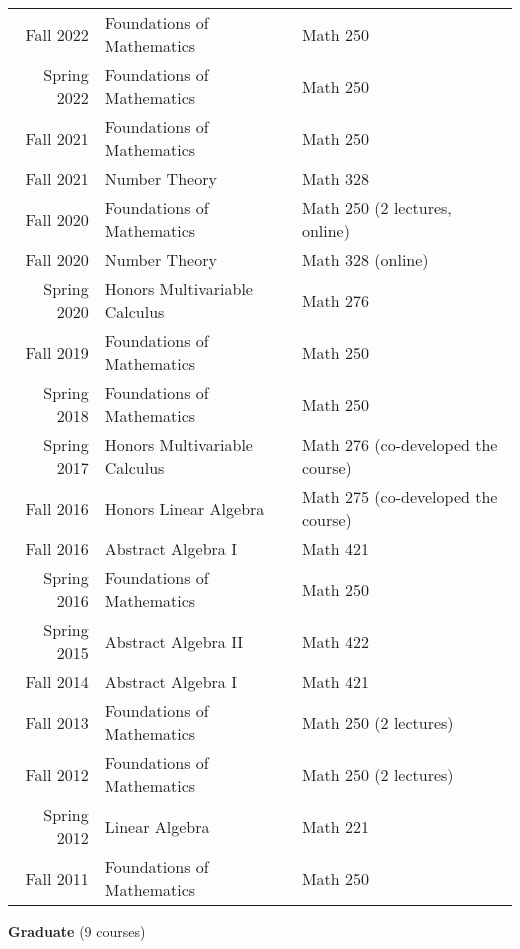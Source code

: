 \documentclass[margin,line]{res}
\newcommand{\defi}[1]{\textsf{#1}} 				%
\begin{document}
\begin{resume}
\begin{tabular}{rll}
 Fall 2022 & \defi{Foundations of Mathematics} & Math 250\\  
 Spring 2022 & \defi{Foundations of Mathematics} & Math 250\\
 Fall 2021 & \defi{Foundations of Mathematics} & Math 250  \\
 Fall 2021 & \defi{Number Theory} & Math 328   \\   
 Fall 2020 & \defi{Foundations of Mathematics} & Math 250 (2 lectures, online) \\
 Fall 2020 & \defi{Number Theory} & Math 328 (online)  \\    
 Spring 2020 & \defi{Honors Multivariable Calculus} & Math 276 \\
 Fall 2019 & \defi{Foundations of Mathematics} & Math 250 \\
 Spring 2018 & \defi{Foundations of Mathematics} & Math 250 \\
 Spring 2017 & \defi{Honors Multivariable Calculus} & Math 276  (co-developed the course) \\
 Fall 2016 & \defi{Honors Linear Algebra} & Math 275 (co-developed the course) \\
 Fall 2016 & \defi{Abstract Algebra I} & Math 421 \\
 Spring 2016 & \defi{Foundations of Mathematics} & Math 250 \\
 Spring 2015 & \defi{Abstract Algebra II} & Math 422 \\
 Fall 2014 & \defi{Abstract Algebra I} & Math 421 \\
 Fall 2013 & \defi{Foundations of Mathematics} & Math 250 (2 lectures) \\
 Fall 2012 & \defi{Foundations of Mathematics} & Math 250 (2 lectures) \\
 Spring 2012 & \defi{Linear Algebra} & Math 221 \\
 Fall 2011 & \defi{Foundations of Mathematics} & Math 250 \\
\end{tabular}

{\bf Graduate} (9 courses)
  \vspace*{-.1in}


\end{resume}
\end{document}
